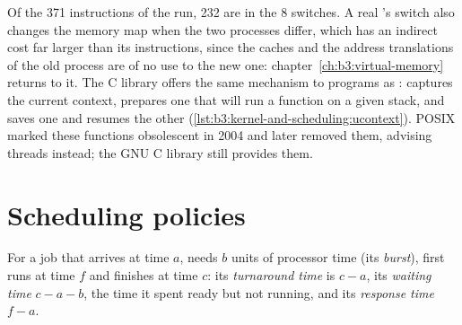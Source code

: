 \label{out:b3:kernel-and-scheduling:switchcount}

Of the 371 instructions of the run, 232 are in the 8 switches. A real 's switch also changes the memory map when the two processes differ, which has an indirect cost far larger than its instructions, since the caches and the address translations of the old process are of no use to the new one: chapter~\ref{ch:b3:virtual-memory} returns to it. The C library offers the same mechanism to programs as :  captures the current context,  prepares one that will run a function on a given stack, and  saves one and resumes the other (\cref{lst:b3:kernel-and-scheduling:ucontext}). POSIX marked these functions obsolescent in 2004 and later removed them, advising threads instead; the GNU C library still provides them. %

\label{lst:b3:kernel-and-scheduling:ucontext}

\label{out:b3:kernel-and-scheduling:ucontext}

\section{Scheduling policies}\label{sec:b3:kernel-and-scheduling:policies}

\begin{definition}\label{def:b3:kernel-and-scheduling:metrics}
For a job that arrives at time $a$, needs $b$ units of processor time (its \emph{burst}), first runs at time $f$ and finishes at time $c$: its \emph{turnaround time} is $c - a$, its \emph{waiting time} $c - a - b$, the time it spent ready but not running, and its \emph{response time} $f - a$.
\end{definition}

